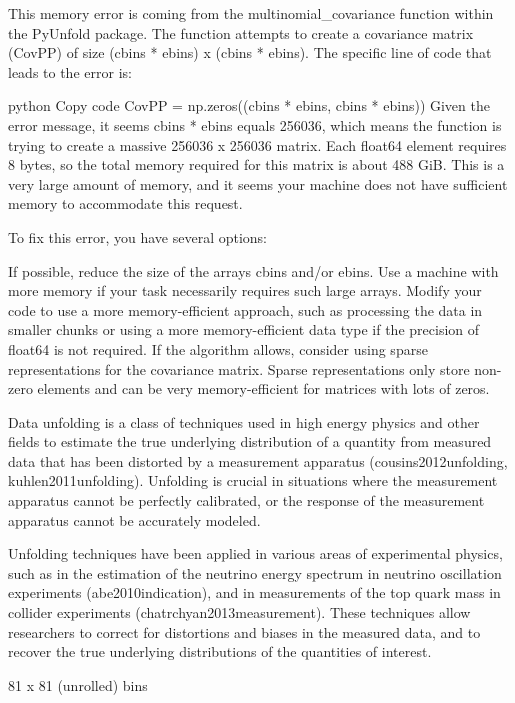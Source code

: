     This memory error is coming from the multinomial\_covariance function within the PyUnfold package. The function attempts to create a covariance matrix (CovPP) of size (cbins * ebins) x (cbins * ebins). The specific line of code that leads to the error is:
    
    python
    Copy code
    CovPP = np.zeros((cbins * ebins, cbins * ebins))
    Given the error message, it seems cbins * ebins equals 256036, which means the function is trying to create a massive 256036 x 256036 matrix. Each float64 element requires 8 bytes, so the total memory required for this matrix is about 488 GiB. This is a very large amount of memory, and it seems your machine does not have sufficient memory to accommodate this request.
    
    To fix this error, you have several options:
    
    If possible, reduce the size of the arrays cbins and/or ebins.
    Use a machine with more memory if your task necessarily requires such large arrays.
    Modify your code to use a more memory-efficient approach, such as processing the data in smaller chunks or using a more memory-efficient data type if the precision of float64 is not required.
    If the algorithm allows, consider using sparse representations for the covariance matrix. Sparse representations only store non-zero elements and can be very memory-efficient for matrices with lots of zeros.
    
    \fi
    Data unfolding is a class of techniques used in high energy physics and other fields to estimate the true underlying distribution of a quantity from measured data that has been distorted by a measurement apparatus (cousins2012unfolding, kuhlen2011unfolding). Unfolding is crucial in situations where the measurement apparatus cannot be perfectly calibrated, or the response of the measurement apparatus cannot be accurately modeled.
    
    Unfolding techniques have been applied in various areas of experimental physics, such as in the estimation of the neutrino energy spectrum in neutrino oscillation experiments (abe2010indication), and in measurements of the top quark mass in collider experiments (chatrchyan2013measurement). These techniques allow researchers to correct for distortions and biases in the measured data, and to recover the true underlying distributions of the quantities of interest.
    
\clearpage

    81 x 81 (unrolled) bins
    
